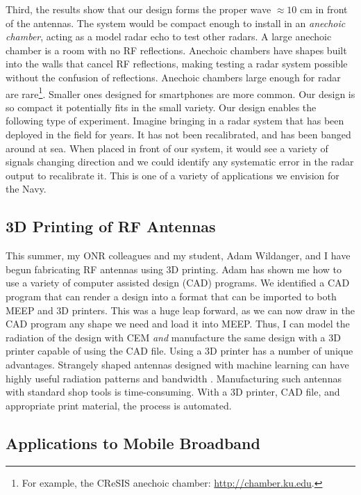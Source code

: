 \documentclass[../../../main.tex]{subfiles}
\begin{document}
Third, the results show that our design forms the proper wave $\approx 10$ cm in front of the antennas.  The system would be compact enough to install in an \textit{anechoic chamber}, acting as a model radar echo to test other radars.  A large anechoic chamber is a room with no RF reflections.  Anechoic chambers have shapes built into the walls that cancel RF reflections, making testing a radar system possible without the confusion of reflections.  Anechoic chambers large enough for radar are rare\footnote{For example, the CReSIS anechoic chamber: \url{http://chamber.ku.edu}.}.  Smaller ones designed for smartphones are more common.  Our design is so compact it potentially fits in the small variety.  Our design enables the following type of experiment. Imagine bringing in a radar system that has been deployed in the field for years.  It has not been recalibrated, and has been banged around at sea.  When placed in front of our system, it would see a variety of signals changing direction and we could identify any systematic error in the radar output to recalibrate it.  This is one of a variety of applications we envision for the Navy.

\subsection{3D Printing of RF Antennas}
\label{sec:3d_printer}

This summer, my ONR colleagues and my student, Adam Wildanger, and I have begun fabricating RF antennas using 3D printing.  Adam has shown me how to use a variety of computer assisted design (CAD) programs.  We identified a CAD program that can render a design into a format that can be imported to both MEEP and 3D printers.  This was a huge leap forward, as we can now draw in the CAD program any shape we need and load it into MEEP.  Thus, I can model the radiation of the design with CEM \textit{and} manufacture the same design with a 3D printer capable of using the CAD file.  Using a 3D printer has a number of unique advantages.  Strangely shaped antennas designed with machine learning can have highly useful radiation patterns and bandwidth \cite{10.3390/electronics10121377} \cite{10.1109/access.2019.2932912}.  Manufacturing such antennas with standard shop tools is time-consuming.  With a 3D printer, CAD file, and appropriate print material, the process is automated.

\subsection{Applications to Mobile Broadband}
\label{sec:applications}
\end{document}
